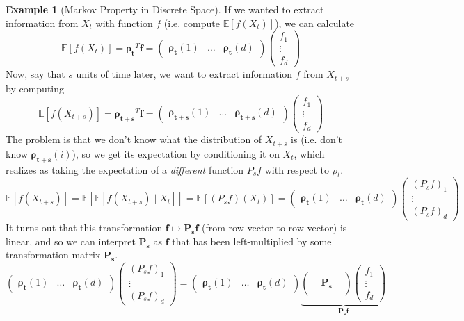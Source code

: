 \documentclass{article}
\theoremstyle{definition}
\newtheorem{example}{Example}[section]
\theoremstyle{remark}
\theoremstyle{definition}
\begin{document}
\begin{example}[Markov Property in Discrete Space]
If we wanted to extract information from $X_t$ with function $f$ (i.e. compute $\mathbb{E}[f(X_t)]$), we can calculate 
\[\mathbb{E}[f(X_t)] = \boldsymbol{\rho_t}^T \mathbf{f} =  \begin{pmatrix} \boldsymbol{\rho_t} (1) & \ldots & \boldsymbol{\rho_t} (d) \end{pmatrix} \begin{pmatrix} f_1 \\ \vdots \\ f_d \end{pmatrix}\] 
Now, say that $s$ units of time later, we want to extract information $f$ from $X_{t + s}$ by computing 
\[\mathbb{E}[f(X_{t + s})] = \boldsymbol{\rho_{t + s}}^T \mathbf{f} = \begin{pmatrix} \boldsymbol{\rho_{t + s}} (1) & \ldots &  \boldsymbol{\rho_{t + s}} (d) \end{pmatrix} \begin{pmatrix} f_1 \\ \vdots \\ f_d \end{pmatrix}\]
The problem is that we don't know what the distribution of $X_{t + s}$ is (i.e. don't know $\boldsymbol{\rho_{t + s}} (i)$), so we get its expectation by conditioning it on $X_t$, which realizes as taking the expectation of a \textit{different} function $P_s f$ with respect to $\rho_t$. 
\[\mathbb{E}[f(X_{t + s})] = \mathbb{E}[ \mathbb{E}[ f(X_{t + s}) \mid X_t]] = \mathbb{E}[(P_s f)(X_t)] = \begin{pmatrix} \boldsymbol{\rho_t} (1) & \ldots & \boldsymbol{\rho_t} (d) \end{pmatrix} \begin{pmatrix} (P_s f)_1 \\ \vdots \\(P_s f)_d \end{pmatrix}\]
It turns out that this transformation $\mathbf{f} \mapsto \mathbf{P_s} \mathbf{f}$ (from row vector to row vector) is linear, and so we can interpret $\mathbf{P_s}$ as $\mathbf{f}$ that has been left-multiplied by some transformation matrix $\mathbf{P_s}$. 
\[\begin{pmatrix} \boldsymbol{\rho_t} (1) & \ldots & \boldsymbol{\rho_t} (d) \end{pmatrix} \begin{pmatrix} (P_s f)_1 \\ \vdots \\(P_s f)_d \end{pmatrix} = \begin{pmatrix} \boldsymbol{\rho_t} (1) & \ldots & \boldsymbol{\rho_t} (d) \end{pmatrix} \underbrace{\begin{pmatrix} && \\ & \mathbf{P_s} & \\ && \end{pmatrix} \begin{pmatrix} f_1 \\ \vdots \\ f_d \end{pmatrix}}_{\mathbf{P_s f}}\]

\end{example}
\end{document}
